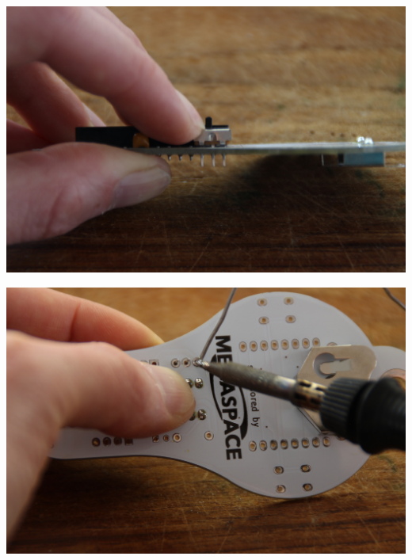 \documentclass{article}
\begin{document}
\begin{minipage}[b]{0.5\textwidth}
	\includegraphics[width=\textwidth]{Bilder2023/IMG_8369.JPG}
\end{minipage}
\begin{minipage}[b]{0.5\textwidth}
	\includegraphics[width=\textwidth]{Bilder2023/IMG_8371.JPG}
\end{minipage}

\vspace{0.5cm}
\end{document}
